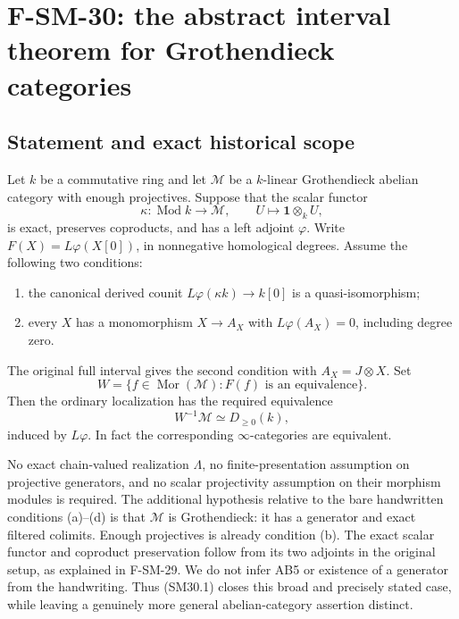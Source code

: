 \documentclass[11pt,a4paper]{article}
\theoremstyle{definition}\newtheorem{definition}[theorem]{Definition}
\theoremstyle{remark}\newtheorem{remark}[theorem]{Remark}
\begin{document}
\section{F-SM-30: the abstract interval theorem for Grothendieck categories}

\subsection{Statement and exact historical scope}
Let \(k\) be a commutative ring and let \(\mathcal M\) be a
\(k\)-linear Grothendieck abelian category with enough projectives.
Suppose that the scalar functor
\[
 \kappa:\operatorname{Mod}k\longrightarrow\mathcal M,
 \qquad U\longmapsto\mathbf1\otimes_k U,
\]
is exact, preserves coproducts, and has a left adjoint \(\varphi\).
Write \(F(X)=L\varphi(X[0])\), in nonnegative homological degrees.
Assume the following two conditions:
\begin{enumerate}
\item the canonical derived counit
\(L\varphi(\kappa k)\to k[0]\) is a quasi-isomorphism;
\item every \(X\) has a monomorphism \(X\to A_X\) with
\(L\varphi(A_X)=0\), including degree zero.
\end{enumerate}
The original full interval gives the second condition with
\(A_X=J\otimes X\).  Set
\[
 W=\{f\in\operatorname{Mor}(\mathcal M):F(f)\text{ is an equivalence}\}.
\]
Then the ordinary localization has the required equivalence
\[
 W^{-1}\mathcal M\simeq D_{\ge0}(k),                         \tag{SM30.1}
\]
induced by \(L\varphi\).  In fact the corresponding
\(\infty\)-categories are equivalent.

No exact chain-valued realization \(\Lambda\), no finite-presentation
assumption on projective generators, and no scalar projectivity
assumption on their morphism modules is required.  The additional
hypothesis relative to the bare handwritten conditions (a)--(d) is
that \(\mathcal M\) is Grothendieck: it has a generator and exact
filtered colimits.  Enough projectives is already condition (b).
The exact scalar functor and coproduct preservation follow from its
two adjoints in the original setup, as explained in F-SM-29.
We do not infer AB5 or existence of a generator from the handwriting.
Thus (SM30.1) closes this broad and precisely stated case, while
leaving a genuinely more general abelian-category assertion distinct.
\end{document}
